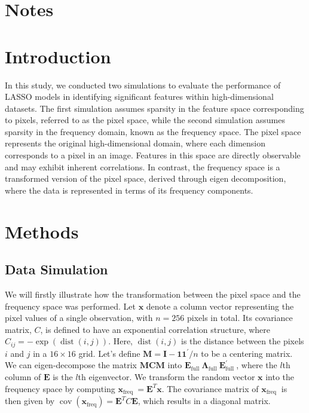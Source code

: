 \documentclass[12pt]{article}
\title{}
\author{Siyang Ren}
\begin{document}
\maketitle

\section*{Notes}

\section*{Introduction}

In this study, we conducted two simulations to evaluate the performance of LASSO models in identifying significant features within high-dimensional datasets. The first simulation assumes sparsity in the feature space corresponding to pixels, referred to as the pixel space, while the second simulation assumes sparsity in the frequency domain, known as the frequency space. The pixel space represents the original high-dimensional domain, where each dimension corresponds to a pixel in an image. Features in this space are directly observable and may exhibit inherent correlations. In contrast, the frequency space is a transformed version of the pixel space, derived through eigen decomposition, where the data is represented in terms of its frequency components.


\section*{Methods}

\subsection*{Data Simulation}

We will firstly illustrate how the transformation between the pixel space and the frequency space was performed. Let \( \mathbf{x} \) denote a column vector representing the pixel values of a single observation, with \( n =256 \) pixels in total. Its covariance matrix, \( C \), is defined to have an exponential correlation structure, where \( C_{i j}=-\exp (\operatorname{dist}(i, j)) \). Here, \( \operatorname{dist}(i, j) \) is the distance between the pixels \( i \) and \( j \) in a \( 16 \times 16 \) grid. Let's define \( \mathbf{M}=\mathbf{I}-\mathbf{1} \mathbf{1}^{\prime} / n \) to be a centering matrix. We can eigen-decompose the matrix \( \mathbf{MCM} \) into \( \mathbf{E}_{\text {full }} \boldsymbol{\Lambda}_{\text {full }} \mathbf{E}_{\text {full }}^{\prime} \), where the \( l \)th column of \( \mathbf{E} \) is the \( l \)th eigenvector. We transform the random vector \( \mathbf{x} \) into the frequency space by computing \( \mathbf{x}_{\text {freq }}=\mathbf{E}^T \mathbf{x} \). The covariance matrix of \( \mathbf{x}_{\text {freq }} \) is then given by \( \operatorname{cov}(\mathbf{x}_{\mathrm{freq}})=\mathbf{E}^T C \mathbf{E} \), which results in a diagonal matrix.
\end{document}
